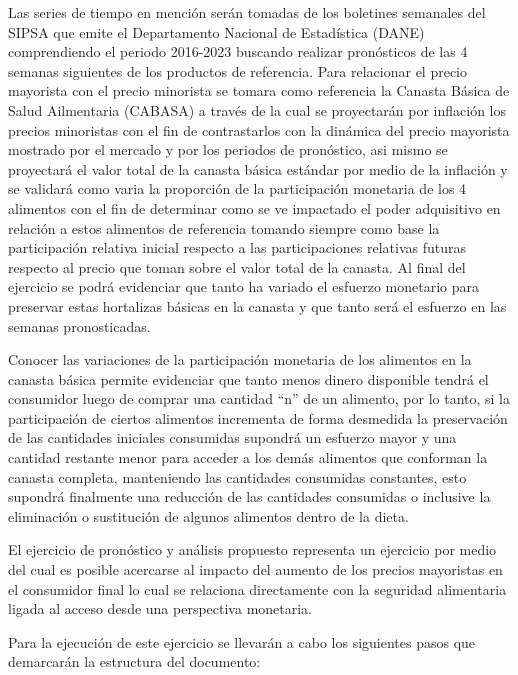 \documentclass[
]{book}
\begin{document}
Las series de tiempo en mención serán tomadas de los boletines semanales del SIPSA que emite el Departamento Nacional de Estadística (DANE) comprendiendo el periodo 2016-2023 buscando realizar pronósticos de las 4 semanas siguientes de los productos de referencia. Para relacionar el precio mayorista con el precio minorista se tomara como referencia la Canasta Básica de Salud Ailmentaria (CABASA) a través de la cual se proyectarán por inflación los precios minoristas con el fin de contrastarlos con la dinámica del precio mayorista mostrado por el mercado y por los periodos de pronóstico, asi mismo se proyectará el valor total de la canasta básica estándar por medio de la inflación y se validará como varia la proporción de la participación monetaria de los 4 alimentos con el fin de determinar como se ve impactado el poder adquisitivo en relación a estos alimentos de referencia tomando siempre como base la participación relativa inicial respecto a las participaciones relativas futuras respecto al precio que toman sobre el valor total de la canasta. Al final del ejercicio se podrá evidenciar que tanto ha variado el esfuerzo monetario para preservar estas hortalizas básicas en la canasta y que tanto será el esfuerzo en las semanas pronosticadas.

Conocer las variaciones de la participación monetaria de los alimentos en la canasta básica permite evidenciar que tanto menos dinero disponible tendrá el consumidor luego de comprar una cantidad ``n'' de un alimento, por lo tanto, si la participación de ciertos alimentos incrementa de forma desmedida la preservación de las cantidades iniciales consumidas supondrá un esfuerzo mayor y una cantidad restante menor para acceder a los demás alimentos que conforman la canasta completa, manteniendo las cantidades consumidas constantes, esto supondrá finalmente una reducción de las cantidades consumidas o inclusive la eliminación o sustitución de algunos alimentos dentro de la dieta.

El ejercicio de pronóstico y análisis propuesto representa un ejercicio por medio del cual es posible acercarse al impacto del aumento de los precios mayoristas en el consumidor final lo cual se relaciona directamente con la seguridad alimentaria ligada al acceso desde una perspectiva monetaria.

Para la ejecución de este ejercicio se llevarán a cabo los siguientes pasos que demarcarán la estructura del documento:
\end{document}

